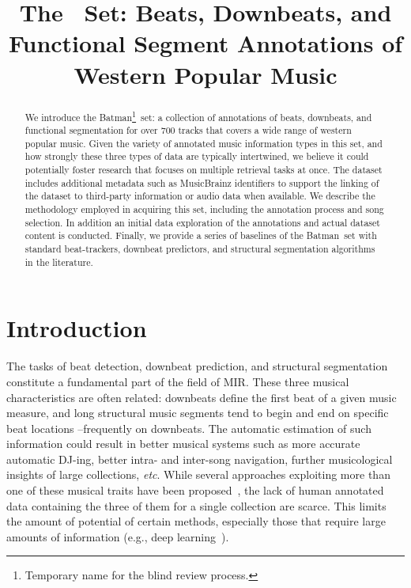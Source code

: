 \documentclass{article}
\title{The \setName~Set: Beats, Downbeats, and Functional Segment Annotations of Western Popular Music}
\newcommand{\setName}{Batman}
\begin{document}
%
\maketitle
%
\begin{abstract}
    We introduce the \setName\footnote{Temporary name for the blind review process.}~set: a collection of annotations of beats, downbeats, and functional segmentation for over 700 tracks that covers a wide range of western popular music.
    Given the variety of annotated music information types in this set, and how strongly these three types of data are typically intertwined, we believe it could potentially foster research that focuses on multiple retrieval tasks at once.
    The dataset includes additional metadata such as MusicBrainz identifiers to support the linking of the dataset to third-party information or audio data when available.
    We describe the methodology employed in acquiring this set, including the annotation process and song selection. In addition an initial data exploration of the annotations and actual dataset content is conducted. 
    Finally, we provide a series of baselines of the \setName~set with standard beat-trackers, downbeat predictors, and structural segmentation algorithms in the literature.
\end{abstract}
%
\section{Introduction}\label{sec:introduction}

The tasks of beat detection, downbeat prediction, and structural segmentation constitute a fundamental part of the field of MIR.
These three musical characteristics are often related: downbeats define the first beat of a given music measure, and long structural music segments tend to begin and end on specific beat locations --frequently on downbeats.
The automatic estimation of such information could result in better musical systems such as more accurate automatic DJ-ing, better intra- and inter-song navigation, further musicological insights of large collections, \emph{etc}.
While several approaches exploiting more than one of these musical traits have been proposed~\cite{Bock2016, Fuentes2019}, the lack of human annotated data containing the three of them for a single collection are scarce.
This limits the amount of potential of certain methods, especially those that require large amounts of information (e.g., deep learning~\cite{Humphrey2012}).
\end{document}
